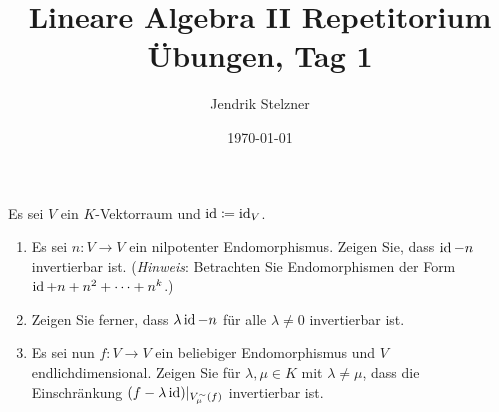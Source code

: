 \documentclass[a4paper, 10pt]{scrartcl}
\title{Lineare Algebra II Repetitorium \\ Übungen, Tag 1}
\author{Jendrik Stelzner}
\date{\today}
\begin{document}
\maketitle


\begin{question}
  Es sei $V$ ein $K$-Vektorraum und $\operatorname{id} \coloneqq \operatorname{id}_V$.
  \begin{enumerate}[leftmargin=*]
    \item
      Es sei $n \colon V \to V$ ein nilpotenter Endomorphismus.
      Zeigen Sie, dass $\operatorname{id} - n$ invertierbar ist.
      (\emph{Hinweis}: Betrachten Sie Endomorphismen der Form $\operatorname{id} + n + n^2 + \dotsb + n^k$.)
    \item
      Zeigen Sie ferner, dass $\lambda \operatorname{id} - n$ für alle $\lambda \neq 0$ invertierbar ist.
    \item
      Es sei nun $f \colon V \to V$ ein beliebiger Endomorphismus und $V$ endlichdimensional.
      Zeigen Sie für $\lambda, \mu \in K$ mit $\lambda \neq \mu$, dass die Einschränkung $(f - \lambda \operatorname{id})|_{V^\sim_\mu(f)}$ invertierbar ist.
  \end{enumerate}
\end{question}
\end{document}
